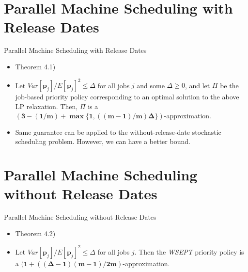 \documentclass{beamer}
\begin{document}
\section{Parallel Machine Scheduling with Release Dates}
\begin{frame}{Parallel Machine Scheduling with Release Dates}
    \begin{itemize}
        \justifying
        \item Theorem 4.1)
        \item[] Let $Var[\pmb{p}_j]/E[\pmb{p}_j]^2 \leq \Delta$ for all jobs $j$ and some $\Delta \geq0$, and let $\Pi$ be the job-based priority policy corresponding to an optimal solution to the above LP relaxation. Then, $\Pi$ is a $\pmb{(3-(1/m)+\max\{1,((m-1)/m)\Delta\})}$-approximation.
        \vspace{0.4cm}
        \item Same guarantee can be applied to the without-release-date stochastic scheduling problem. However, we can have a better bound.
        \vspace{3cm}
    \end{itemize}
\end{frame}


\section{Parallel Machine Scheduling without Release Dates}
\begin{frame}{Parallel Machine Scheduling without Release Dates}
    \begin{itemize}
        \justifying
        \item Theorem 4.2)
        \item[] Let $Var[\pmb{p}_j]/E[\pmb{p}_j]^2 \leq \Delta$ for all jobs $j$. Then the \textit{WSEPT} priority policy is a $\pmb{(1+((\Delta-1)(m-1)/2m)}$-approximation.
        \vspace{5.4cm}
    \end{itemize}
\end{frame}
\end{document}

